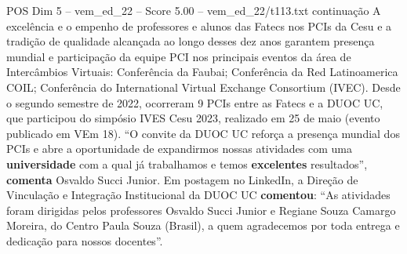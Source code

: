 \begin{textsample}{POS Dim 5 – vem\_ed\_22 – Score 5.00 – vem\_ed\_22/t113.txt}  \label{ex:f5_pos_094}
continuação A excelência e o empenho de professores e alunos das Fatecs nos PCIs da Cesu e a tradição de qualidade alcançada ao longo desses dez anos garantem presença mundial e participação da equipe PCI nos principais eventos da área de Intercâmbios Virtuais: Conferência da Faubai; Conferência da Red Latinoamerica COIL; Conferência do International Virtual Exchange Consortium (IVEC).
Desde o segundo semestre de 2022, ocorreram 9 PCIs entre as Fatecs e a DUOC UC, que participou do simpósio IVES Cesu 2023, realizado em 25 de maio (evento publicado em VEm 18). “O convite da DUOC UC reforça a presença mundial dos PCIs e abre a oportunidade de expandirmos nossas atividades com uma \textbf{universidade} com a qual já trabalhamos e temos \textbf{excelentes} resultados”, \textbf{comenta} Osvaldo Succi Junior.
Em postagem no LinkedIn, a Direção de Vinculação e Integração Institucional da DUOC UC \textbf{comentou}: “As atividades foram dirigidas pelos professores Osvaldo Succi Junior e Regiane Souza Camargo Moreira, do Centro Paula Souza (Brasil), a quem agradecemos por toda entrega e dedicação para nossos docentes”.

\end{textsample}
